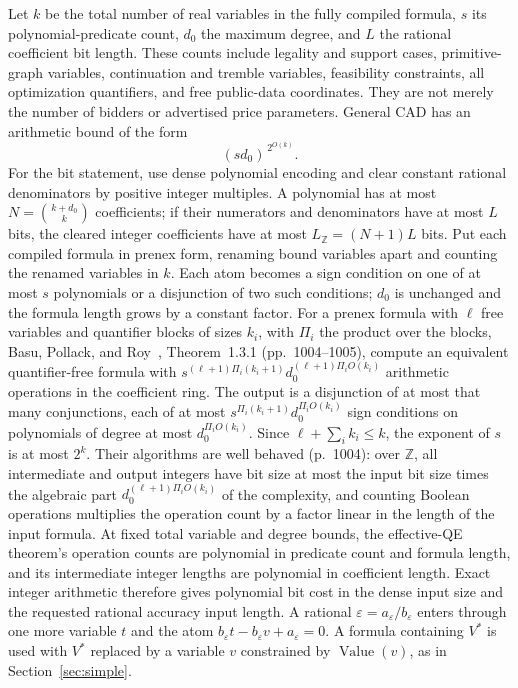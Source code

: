 \documentclass[11pt,a4paper]{article}
\numberwithin{equation}{section}
\theoremstyle{definition}
\DeclareMathOperator{\Val}{Value}
\begin{document}
Let \(k\) be the total number of real variables in the fully compiled
formula, \(s\) its polynomial-predicate count, \(d_0\) the maximum
degree, and \(L\) the rational coefficient bit length.
These counts include legality and support cases, primitive-graph
variables, continuation and tremble variables, feasibility constraints,
all optimization quantifiers, and free public-data coordinates.
They are not merely the number of bidders or advertised price parameters.
General CAD has an arithmetic bound of the form
\[
 (s d_0)^{\,2^{O(k)}}.
\]
For the bit statement, use dense polynomial encoding and clear constant
rational denominators by positive integer multiples.
A polynomial has at most \(N=\binom{k+d_0}{k}\) coefficients; if their
numerators and denominators have at most \(L\) bits, the cleared integer
coefficients have at most \(L_{\mathbb Z}=(N+1)L\) bits.
Put each compiled formula in prenex form, renaming bound variables apart
and counting the renamed variables in \(k\). Each atom becomes a sign
condition on one of at most \(s\) polynomials or a disjunction of two
such conditions; \(d_0\) is unchanged and the formula length grows by a
constant factor.
For a prenex formula with \(\ell\) free variables and quantifier blocks
of sizes \(k_i\), with \(\Pi_i\) the product over the blocks, Basu,
Pollack, and Roy~\cite{BPR1996}, Theorem~1.3.1 (pp.~1004--1005), compute
an equivalent quantifier-free formula with
\(s^{(\ell+1)\Pi_i(k_i+1)}d_0^{(\ell+1)\Pi_iO(k_i)}\) arithmetic
operations in the coefficient ring. The output is a disjunction of at
most that many conjunctions, each of at most
\(s^{\Pi_i(k_i+1)}d_0^{\Pi_iO(k_i)}\) sign conditions on polynomials
of degree at most \(d_0^{\Pi_iO(k_i)}\).
Since \(\ell+\sum_ik_i\le k\), the exponent of \(s\) is at most \(2^k\).
Their algorithms are well behaved (p.~1004): over \(\mathbb Z\), all
intermediate and output integers have bit size at most the input bit
size times the algebraic part \(d_0^{(\ell+1)\Pi_iO(k_i)}\) of the
complexity, and counting Boolean operations multiplies the operation
count by a factor linear in the length of the input formula.
At fixed total variable and degree bounds, the effective-QE theorem's
operation counts are polynomial in predicate count and formula length,
and its intermediate integer lengths are polynomial in coefficient
length. Exact integer arithmetic therefore gives polynomial bit cost
in the dense input size and the requested rational accuracy input length.
A rational \(\varepsilon=a_\varepsilon/b_\varepsilon\) enters through one
more variable \(t\) and the atom \(b_\varepsilon t-b_\varepsilon v
+a_\varepsilon=0\). A formula containing \(V^*\) is used with \(V^*\)
replaced by a variable \(v\) constrained by \(\Val(v)\), as in
Section~\ref{sec:simple}.
\end{document}

